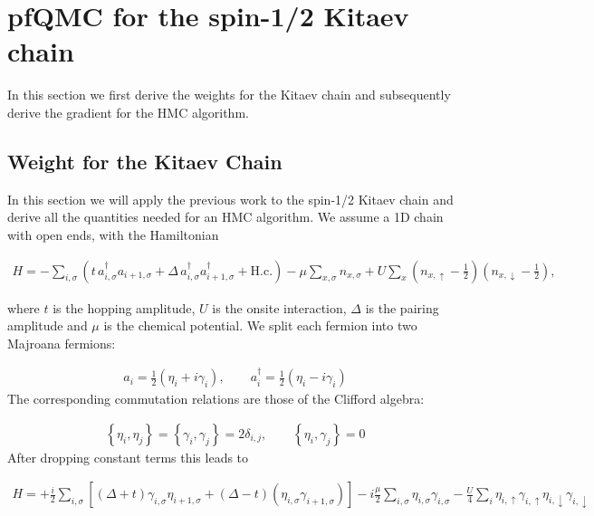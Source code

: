 \documentclass{article}
\begin{document}
\section{pfQMC for the spin-1/2 Kitaev chain}
In this section we first derive the weights for the Kitaev chain and subsequently derive the gradient for the HMC algorithm.
\subsection{Weight for the Kitaev Chain}

In this section we will apply the previous work to the spin-1/2 Kitaev chain and derive all the quantities needed for an HMC algorithm. We assume a 1D chain with open ends, with the Hamiltonian

\begin{align}
	H
	= - \sum_{i,\sigma}
	\left(
	t\, a_{i,\sigma}^\dagger a_{i+1,\sigma}
	+ \Delta\, a_{i,\sigma}^\dagger a_{i+1,\sigma}^\dagger
	+ \mathrm{H.c.}
	\right)
	- \mu \sum_{x,\sigma} n_{x,\sigma}
	+ U \sum_x
	\left(n_{x,\uparrow}-\frac{1}{2}\right)
	\left(n_{x,\downarrow}-\frac{1}{2}\right),
\end{align}

where $t$ is the hopping amplitude, $U$ is the onsite interaction, $\Delta$ is the pairing amplitude and $\mu$ is the chemical potential. We split each fermion into two Majroana fermions:

\begin{align}
	a_i = \frac{1}{2}\left(\eta_i + i \gamma_i\right), \quad \quad a_i^\dagger = \frac{1}{2}\left(\eta_i - i \gamma_i\right)
\end{align}
The corresponding commutation relations are those of the Clifford algebra:

\begin{align}
	\left\{\eta_i, \eta_j\right\} = \left\{\gamma_i, \gamma_j\right\} = 2\delta_{i,j},\quad\quad \left\{\eta_i,\gamma_j\right\}= 0
\end{align}
After dropping constant terms this leads to

\begin{align}
	H = +\frac{i}{2}\sum_{i,\sigma}^{ } \left[\left(\Delta + t\right)  \gamma_{i,\sigma}\eta_{i+1,\sigma}   + \left(\Delta - t\right)  \left(\eta_{i,\sigma}\gamma_{i+1,\sigma} \right) \right] - i\frac{\mu}{2}\sum_{i,\sigma}^{ }\eta_{i,\sigma}\gamma_{i,\sigma} - \frac{U}{4}\sum_{i}^{ } \eta_{i,\uparrow}\gamma_{i,\uparrow}\eta_{i,\downarrow}\gamma_{i,\downarrow} 
\end{align}
\end{document}
